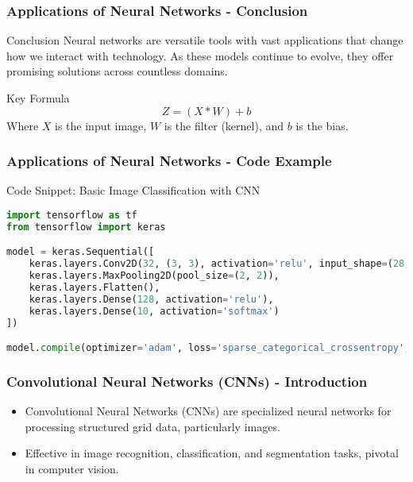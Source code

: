 \documentclass[aspectratio=169]{beamer}
\begin{document}
\begin{frame}[fragile]
    \frametitle{Applications of Neural Networks - Conclusion} 
    \begin{block}{Conclusion}
        Neural networks are versatile tools with vast applications that change how we interact with technology. As these models continue to evolve, they offer promising solutions across countless domains.
    \end{block}

    \begin{block}{Key Formula}
        \begin{equation}
            Z = (X * W) + b
        \end{equation}
        Where \( X \) is the input image, \( W \) is the filter (kernel), and \( b \) is the bias.
    \end{block}
\end{frame}

\begin{frame}[fragile]
    \frametitle{Applications of Neural Networks - Code Example}
    \begin{block}{Code Snippet: Basic Image Classification with CNN}
    \begin{lstlisting}[language=Python]
import tensorflow as tf
from tensorflow import keras

model = keras.Sequential([
    keras.layers.Conv2D(32, (3, 3), activation='relu', input_shape=(28, 28, 1)),
    keras.layers.MaxPooling2D(pool_size=(2, 2)),
    keras.layers.Flatten(),
    keras.layers.Dense(128, activation='relu'),
    keras.layers.Dense(10, activation='softmax')
])

model.compile(optimizer='adam', loss='sparse_categorical_crossentropy', metrics=['accuracy'])
    \end{lstlisting}
    \end{block}
\end{frame}

\begin{frame}[fragile]
    \frametitle{Convolutional Neural Networks (CNNs) - Introduction}
    \begin{itemize}
        \item Convolutional Neural Networks (CNNs) are specialized neural networks for processing structured grid data, particularly images.
        \item Effective in image recognition, classification, and segmentation tasks, pivotal in computer vision.
    \end{itemize}
\end{frame}
\end{document}
